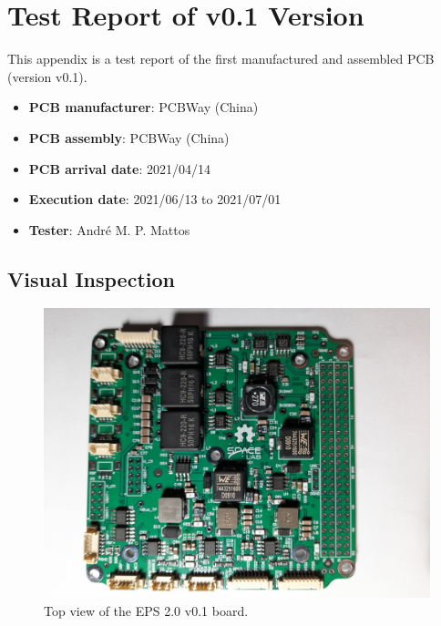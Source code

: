%
%
%
%
%

%
%
%
%
%
%

\chapter{Test Report of v0.1 Version} \label{anx:test-report-v01}

This appendix is a test report of the first manufactured and assembled PCB (version v0.1).

\begin{itemize}
    \item \textbf{PCB manufacturer}: PCBWay (China)
    \item \textbf{PCB assembly}: PCBWay (China)
    \item \textbf{PCB arrival date}: 2021/04/14
    \item \textbf{Execution date}: 2021/06/13 to 2021/07/01
    \item \textbf{Tester}: André M. P. Mattos
\end{itemize}



\section{Visual Inspection}

\begin{figure}[!ht]
    \begin{center}
        \includegraphics[width=0.75\columnwidth]{figures/v01/eps2-v01-top.jpg}
        \caption{Top view of the EPS 2.0 v0.1 board.}
        \label{fig:eps2-v01-top}
    \end{center}
\end{figure}

